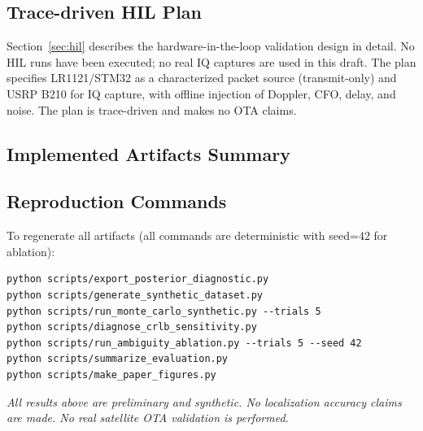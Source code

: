 \subsection{Trace-driven HIL Plan}
Section~\ref{sec:hil} describes the hardware-in-the-loop validation design
in detail.  No HIL runs have been executed; no real IQ captures are used in
this draft.  The plan specifies LR1121/STM32 as a characterized packet source
(transmit-only) and USRP B210 for IQ capture, with offline injection of
Doppler, CFO, delay, and noise.  The plan is trace-driven and makes no OTA
claims.

\subsection{Implemented Artifacts Summary}


\subsection{Reproduction Commands}
To regenerate all artifacts (all commands are deterministic with seed=42 for ablation):
\begin{verbatim}
python scripts/export_posterior_diagnostic.py
python scripts/generate_synthetic_dataset.py
python scripts/run_monte_carlo_synthetic.py --trials 5
python scripts/diagnose_crlb_sensitivity.py
python scripts/run_ambiguity_ablation.py --trials 5 --seed 42
python scripts/summarize_evaluation.py
python scripts/make_paper_figures.py
\end{verbatim}

\textit{All results above are preliminary and synthetic.  No localization
accuracy claims are made.  No real satellite OTA validation is performed.}